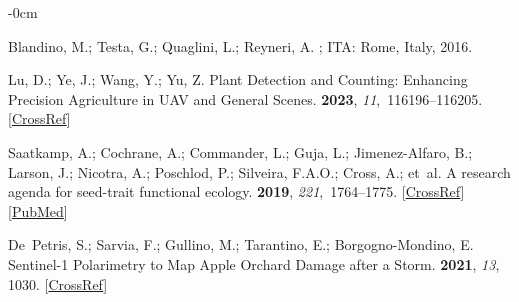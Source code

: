\documentclass[12pt,a4paper,oneside]{report}
\newlength{\extralength}
\begin{document}
\begin{adjustwidth}{-\extralength}{0cm}



\begin{thebibliography}{999}

Blandino, M.; Testa, G.; Quaglini, L.; Reyneri, A.
; ITA: Rome, Italy, 
2016.


Lu, D.; Ye, J.; Wang, Y.; Yu, Z.
\newblock Plant Detection and Counting: Enhancing Precision Agriculture in UAV
and General Scenes.
 {\bf 2023}, {\em 11},~116196--116205. [\href{http://doi.org/10.1109/ACCESS.2023.3325747}{CrossRef}]

Saatkamp, A.; Cochrane, A.; Commander, L.; Guja, L.; Jimenez-Alfaro, B.;
Larson, J.; Nicotra, A.; Poschlod, P.; Silveira, F.A.O.; Cross, A.;  et~al.
\newblock A research agenda for seed-trait functional ecology.
 {\bf 2019}, {\em 221},~1764--1775. [\href{http://dx.doi.org/10.1111/nph.15502}{CrossRef}] [\href{http://www.ncbi.nlm.nih.gov/pubmed/30269352}{PubMed}]

De~Petris, S.; Sarvia, F.; Gullino, M.; Tarantino, E.; Borgogno-Mondino, E.
\newblock Sentinel-1 Polarimetry to Map Apple Orchard Damage after a Storm.
 {\bf 2021}, {\em 13}, 1030. [\href{http://dx.doi.org/10.3390/rs13051030}{CrossRef}]


\end{thebibliography}
\end{adjustwidth}
\end{document}
